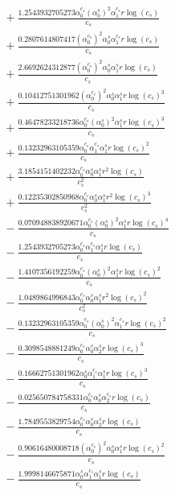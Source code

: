 \documentclass[10pt]{article}
\begin{document}
\begin{align*}
&{}  + \frac{1.2543932705273 \alpha_{0}^{c_s} \left(\alpha_{0}^s\right)^{2} \alpha_{1}^{c_s} r \log{\left(c_{s} \right)}}{c_{s}} \\
&{}  + \frac{0.2807614807417 \left(\alpha_{0}^{c_s}\right)^{2} \alpha_{0}^s \alpha_{1}^{c_s} r \log{\left(c_{s} \right)}}{c_{s}} \\
&{}  + \frac{2.6692624312877 \left(\alpha_{0}^{c_s}\right)^{2} \alpha_{0}^s \alpha_{1}^s r \log{\left(c_{s} \right)}}{c_{s}} \\
&{}  + \frac{0.10412751301962 \left(\alpha_{0}^{c_s}\right)^{2} \alpha_{0}^s \alpha_{1}^s r \log{\left(c_{s} \right)}^{3}}{c_{s}} \\
&{}  + \frac{0.46478233218736 \alpha_{0}^{c_s} \left(\alpha_{0}^s\right)^{2} \alpha_{1}^s r \log{\left(c_{s} \right)}^{3}}{c_{s}} \\
&{}  + \frac{0.13232963105359 \alpha_{0}^{c_s} \alpha_{1}^{c_s} \alpha_{1}^s r \log{\left(c_{s} \right)}^{2}}{c_{s}} \\
&{}  + \frac{3.1854151402232 \alpha_{0}^{c_s} \alpha_{0}^s \alpha_{1}^s r^{2} \log{\left(c_{s} \right)}}{c_{s}^{2}} \\
&{}  + \frac{0.12235302850968 \alpha_{0}^{c_s} \alpha_{0}^s \alpha_{1}^s r^{2} \log{\left(c_{s} \right)}^{3}}{c_{s}^{2}} \\
&{}  - \frac{0.070948838920671 \alpha_{0}^{c_s} \left(\alpha_{0}^s\right)^{2} \alpha_{1}^s r \log{\left(c_{s} \right)}^{4}}{c_{s}} \\
&{}  - \frac{1.2543932705273 \alpha_{0}^{c_s} \alpha_{1}^{c_s} \alpha_{1}^s r \log{\left(c_{s} \right)}}{c_{s}} \\
&{}  - \frac{1.4107356192259 \alpha_{0}^{c_s} \left(\alpha_{0}^s\right)^{2} \alpha_{1}^s r \log{\left(c_{s} \right)}^{2}}{c_{s}} \\
&{}  - \frac{1.0489864996843 \alpha_{0}^{c_s} \alpha_{0}^s \alpha_{1}^s r^{2} \log{\left(c_{s} \right)}^{2}}{c_{s}^{2}} \\
&{}  - \frac{0.13232963105359 \alpha_{0}^{c_s} \left(\alpha_{0}^s\right)^{2} \alpha_{1}^{c_s} r \log{\left(c_{s} \right)}^{2}}{c_{s}} \\
&{}  - \frac{0.3098548881249 \alpha_{0}^{c_s} \alpha_{0}^s \alpha_{2}^s r \log{\left(c_{s} \right)}^{3}}{c_{s}} \\
&{}  - \frac{0.16662751301962 \alpha_{0}^s \alpha_{1}^{c_s} \alpha_{1}^s r \log{\left(c_{s} \right)}^{3}}{c_{s}} \\
&{}  - \frac{0.025650784758331 \alpha_{0}^{c_s} \alpha_{0}^s \alpha_{2}^{c_s} r \log{\left(c_{s} \right)}}{c_{s}} \\
&{}  - \frac{1.7849553829754 \alpha_{0}^{c_s} \alpha_{0}^s \alpha_{2}^s r \log{\left(c_{s} \right)}}{c_{s}} \\
&{}  - \frac{0.90616480008718 \left(\alpha_{0}^{c_s}\right)^{2} \alpha_{0}^s \alpha_{1}^s r \log{\left(c_{s} \right)}^{2}}{c_{s}} \\
&{}  - \frac{1.9998146675871 \alpha_{0}^s \alpha_{1}^{c_s} \alpha_{1}^s r \log{\left(c_{s} \right)}}{c_{s}}
\end{align*}
\end{document}
